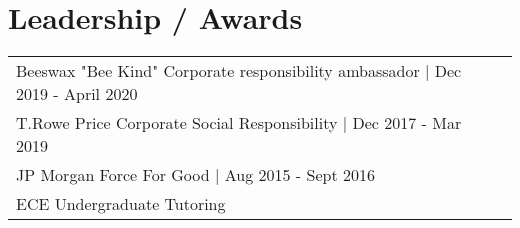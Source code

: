 \documentclass[letterpaper]{deedy-resume-openfont} %
\begin{document}
\begin{minipage}[t]{0.66\textwidth}




\section{Leadership / Awards}

\begin{tabular}{lll}
Beeswax "Bee Kind" Corporate responsibility ambassador | Dec 2019 - April 2020 \\
T.Rowe Price Corporate Social Responsibility | Dec 2017 - Mar 2019 \\
JP Morgan Force For Good | Aug 2015 - Sept 2016 \\
ECE Undergraduate Tutoring\\
\end{tabular}





\end{minipage} %








\end{document}
